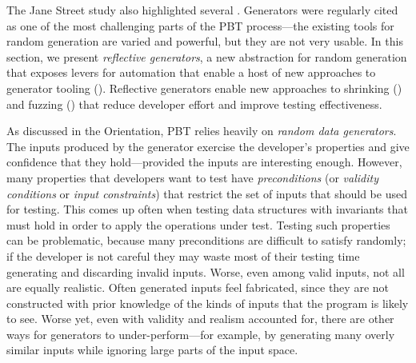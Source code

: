%
The Jane Street study also highlighted several .
Generators were regularly cited as one of the most challenging parts of the PBT
process---the existing tools for random generation are varied and powerful, but
they are not very usable.  In this section, we present {\em reflective
generators}, a new abstraction for random generation that exposes levers for
automation that enable a host of new approaches to generator
tooling (). Reflective generators enable new
approaches to shrinking () and fuzzing
() that reduce developer effort and improve testing
effectiveness.

As discussed in the Orientation, PBT relies heavily on {\em random data
generators}. The inputs produced by the generator exercise the developer's
properties and give confidence that they hold---provided the inputs are
interesting enough.
%
However,
many properties that developers want to test have {\em preconditions}
(or {\em validity conditions} or {\em input constraints}) that
restrict the set of inputs that should be used for testing. This comes up often
when testing data structures with invariants that must hold in order to apply
the operations under test. Testing such properties can be problematic, because
many preconditions are difficult to satisfy randomly; if the developer is not
careful they may waste most of their testing time generating and
discarding invalid inputs.
%
Worse, even among valid inputs, not all are equally realistic. Often generated inputs
feel fabricated, since they are not constructed with prior knowledge of the
kinds of inputs that the program is likely to see.
%
Worse yet, even with validity and realism accounted for, there are
other ways for generators to under-perform---for example, by
generating many overly similar inputs while ignoring large parts of
the input space.


